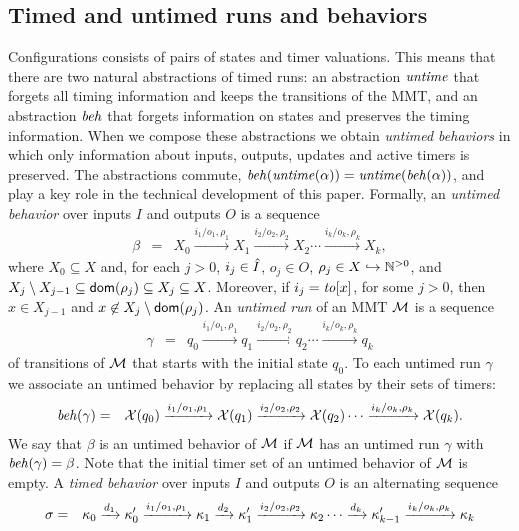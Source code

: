 \subsection{Timed and untimed runs and behaviors}
Configurations consists of pairs of states and timer valuations. This means that there are two natural abstractions of
timed runs: an abstraction $\mathit{untime}$ that forgets all timing information and keeps the transitions of the MMT, 
and an abstraction $\mathit{beh}$ that forgets information on states and preserves the timing information.
When we compose these abstractions we obtain \emph{untimed behaviors} in which only information about inputs, outputs,
updates and active timers is preserved.
The abstractions commute, $\mathit{beh}(\mathit{untime}(\alpha))=\mathit{untime}(\mathit{beh}(\alpha))$, and play a key role in
the technical development of this paper.
%
Formally, an \emph{untimed behavior} over inputs $I$ and outputs $O$ is a sequence 
\begin{eqnarray*}
\beta & = & X_0 \xrightarrow{i_1/o_1, \rho_1} X_1  \xrightarrow{i_2/o_2, \rho_2} X_2 \cdots \xrightarrow{i_k/o_k, \rho_k} X_{k},
\end{eqnarray*}
where $X_0 \subseteq X$ and, for each $j>0$,  $i_j \in \hat{I}$, $o_j \in O$, $\rho_j \in X \hookrightarrow {\mathbb N}^{>0}$, and
 $X_j \setminus X_{j-1}  \subseteq {\textsf{dom}}(\rho_j) \subseteq X_j \subseteq X$.
Moreover, if $i_j = \mathit{to}[x]$, for some $j>0$, then $x \in X_{j-1}$ and $x \not\in X_j \setminus {\textsf{dom}}(\rho_j)$.
%
An \emph{untimed run} of an MMT ${\cal M}$ is a sequence
\begin{eqnarray*}
\gamma & = & q_0 \xrightarrow{i_1/o_1, \rho_1} q_1  \xrightarrow{i_2/o_2, \rho_2} q_2 \cdots \xrightarrow{i_k/o_k, \rho_k} q_k
\end{eqnarray*}
of transitions of ${\cal M}$ that starts with the initial state $q_0$. 
To each untimed run $\gamma$ we associate an untimed behavior by replacing all
states by their sets of timers:
\begin{eqnarray*}
\mathit{beh}(\gamma) & = & \mathcal{X}(q_0) \xrightarrow{i_1/o_1, \rho_1} \mathcal{X}(q_1)  \xrightarrow{i_2/o_2, \rho_2} \mathcal{X}(q_2) \cdots \xrightarrow{i_k/o_k, \rho_k} \mathcal{X}(q_k).
\end{eqnarray*}
We say that $\beta$ is an untimed behavior of ${\cal M}$ if ${\cal M}$ has an untimed run $\gamma$ with $\mathit{beh}(\gamma) = \beta$.
Note that the initial timer set of an untimed behavior of ${\cal M}$ is empty.
%
A \emph{timed behavior} over inputs $I$ and outputs $O$ is an alternating sequence
\begin{eqnarray}
\label{timedbehavior}
\sigma & = & \kappa_0 \xrightarrow{d_1} \kappa'_0 \xrightarrow{i_1/o_1, \rho_1} \kappa_1 \xrightarrow{d_2} \kappa'_1 \xrightarrow{i_2/o_2, \rho_2} \kappa_2 \cdots
\xrightarrow{d_k} \kappa'_{k-1} \xrightarrow{i_k/o_k, \rho_k} \kappa_{k}
\end{eqnarray}
